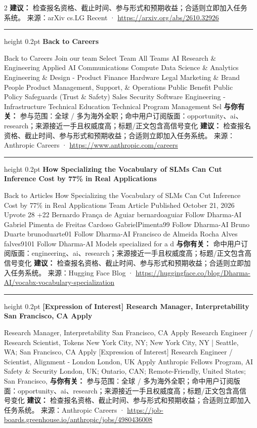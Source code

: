\documentclass[10.5pt]{ctexart}
\begin{document}
\begin{multicols}{2}
\textbf{建议：} 检查报名资格、截止时间、参与形式和预期收益；合适则立即加入任务系统。
{\footnotesize\color{ormuted} 来源：arXiv cs.LG Recent · \url{https://arxiv.org/abs/2610.32926}}
\vspace{2mm}
\hrule height 0.2pt
\vspace{2mm}
{\large\bfseries Back to Careers}\par
Back to Careers Join our team Select Team All Teams AI Research \& Engineering Applied AI Communications Compute Data Science \& Analytics Engineering \& Design - Product Finance Hardware Legal Marketing \& Brand People Product Management, Support, \& Operations Public Benefit Public Policy Safeguards (Trust \& Safety) Sales Security Software Engineering - Infrastructure Technical Education Technical Program Management Sel
\textbf{与你有关：} 参与范围：全球 / 多为海外全职；命中用户订阅版面：opportunity、ai、research；来源接近一手且权威度高；标题/正文包含高信号变化
\textbf{建议：} 检查报名资格、截止时间、参与形式和预期收益；合适则立即加入任务系统。
{\footnotesize\color{ormuted} 来源：Anthropic Careers · \url{https://www.anthropic.com/careers}}
\vspace{2mm}
\hrule height 0.2pt
\vspace{2mm}
{\large\bfseries How Specializing the Vocabulary of SLMs Can Cut Inference Cost by 77\% in Real Applications}\par
Back to Articles How Specializing the Vocabulary of SLMs Can Cut Inference Cost by 77\% in Real Applications Team Article Published October 21, 2026 Upvote 28 +22 Bernardo França de Aguiar bernardoaguiar Follow Dharma-AI Gabriel Pimenta de Freitas Cardoso GabrielPimenta99 Follow Dharma-AI Bruno Duarte brunoduarte01 Follow Dharma-AI Francisco de Almeida Rocha Alves falves9101 Follow Dharma-AI Models specialized for a d
\textbf{与你有关：} 命中用户订阅版面：engineering、ai、research；来源接近一手且权威度高；标题/正文包含高信号变化
\textbf{建议：} 检查报名资格、截止时间、参与形式和预期收益；合适则立即加入任务系统。
{\footnotesize\color{ormuted} 来源：Hugging Face Blog · \url{https://huggingface.co/blog/Dharma-AI/vocabx-vocabulary-specialization}}
\vspace{2mm}
\hrule height 0.2pt
\vspace{2mm}
{\large\bfseries [Expression of Interest] Research Manager, Interpretability San Francisco, CA Apply}\par
[Expression of Interest] Research Manager, Interpretability San Francisco, CA Apply Research Engineer / Research Scientist, Tokens New York City, NY; New York City, NY | Seattle, WA; San Francisco, CA Apply [Expression of Interest] Research Engineer / Scientist, Alignment - London London, UK Apply Anthropic Fellows Program, AI Safety \& Security London, UK; Ontario, CAN; Remote-Friendly, United States; San Francisco, 
\textbf{与你有关：} 参与范围：全球 / 多为海外全职；命中用户订阅版面：opportunity、ai、research；来源接近一手且权威度高；标题/正文包含高信号变化
\textbf{建议：} 检查报名资格、截止时间、参与形式和预期收益；合适则立即加入任务系统。
{\footnotesize\color{ormuted} 来源：Anthropic Careers · \url{https://job-boards.greenhouse.io/anthropic/jobs/4980436008}}
\end{multicols}
\end{document}
